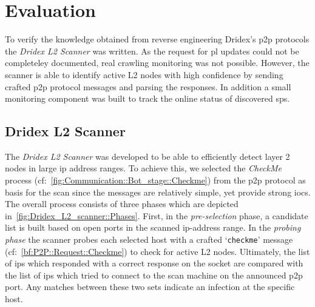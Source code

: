 \chapter{Evaluation\label{ch:Evaluation}}


To verify the knowledge obtained from reverse engineering Dridex's \gls{p2p} protocols the \emph{Dridex L2 Scanner} was written.
As the request for \gls{pl} updates could not be completeley documented, real crawling monitoring was not possible.
However, the scanner is able to identify active L2 nodes with high confidence by sending crafted \gls{p2p} protocol messages and parsing the responses.
In addition a small monitoring component was built to track the online status of discovered \glspl{sp}.

\section{Dridex L2 Scanner\label{sec:Evaluation::Dridex_L2_scanner}}
The \emph{Dridex L2 Scanner} was developed to be able to efficiently detect layer 2 nodes in large \gls{ip} address ranges.
To achieve this, we selected the \emph{CheckMe} process (cf:~\autoref{fig:Communication::Bot_stage::Checkme}) from the \gls{p2p} protocol as basis for the scan since the messages are relatively simple, yet provide strong \glspl{ioc}.
The overall process consists of three phases which are depicted in~\autoref{fig:Dridex_L2_scanner::Phases}.
First, in the \emph{pre-selection} phase, a candidate list is built based on open ports in the scanned \gls{ip}-address range.
In the \emph{probing phase} the scanner probes each selected host with a crafted `\lstinline|checkme|' message (cf:~\autoref{bf:P2P::Request::Checkme}) to check for active L2 nodes.
Ultimately, the list of \glspl{ip} which responded with a correct response on the socket are compared with the list of \glspl{ip} which tried to connect to the scan machine on the announced \gls{p2p} port.
Any matches between these two sets indicate an infection at the specific host. \\

